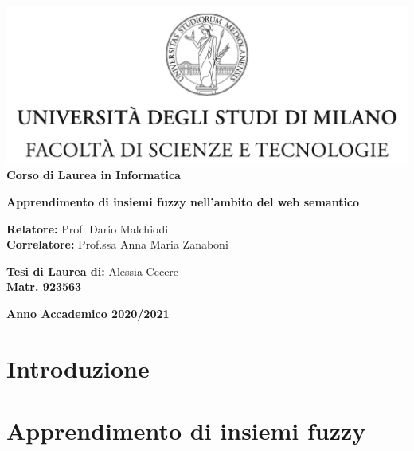 \documentclass[12pt,a4paper]{report}
\begin{document}
\begin{titlepage}
\begin{center}
\includegraphics[width=\textwidth]{Logo.jpg}\\
{\large{\bf Corso di Laurea in Informatica}}
\end{center}
\vspace{12mm}
\begin{center}
{\huge{\bf Apprendimento di insiemi fuzzy nell'ambito del web semantico}}\\
\end{center}
\vspace{12mm}
\begin{flushleft}
{\large{\bf Relatore:}}
{\large{Prof. Dario Malchiodi}}\\
\vspace{4mm}
{\large{\bf Correlatore:}}
{\large{Prof.ssa Anna Maria Zanaboni}}\\
\end{flushleft}
\vspace{12mm}
\begin{flushright}
{\large{\bf Tesi di Laurea di:}}
{\large{Alessia Cecere}}\\
{\large{\bf Matr. 923563}}\\
\end{flushright}
\vspace{4mm}
\begin{center}
{\large{\bf Anno Accademico 2020/2021}}
\end{center}
\end{titlepage}


\tableofcontents


\chapter*{Introduzione}

\chapter{Apprendimento di insiemi fuzzy}
\end{document}
